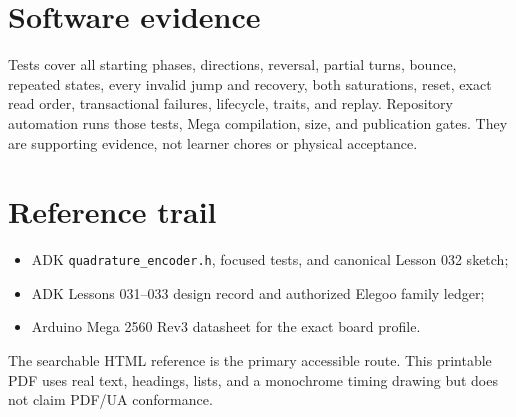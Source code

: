 \documentclass[11pt]{article}
\begin{document}
\section{Software evidence}

Tests cover all starting phases, directions, reversal, partial turns, bounce,
repeated states, every invalid jump and recovery, both saturations, reset,
exact read order, transactional failures, lifecycle, traits, and replay.
Repository automation runs those tests, Mega compilation, size, and publication
gates. They are supporting evidence, not learner chores or physical acceptance.

\section{Reference trail}

\begin{itemize}
  \item ADK \texttt{quadrature\_encoder.h}, focused tests, and canonical
        Lesson 032 sketch;
  \item ADK Lessons 031--033 design record and authorized Elegoo family ledger;
  \item Arduino Mega 2560 Rev3 datasheet for the exact board profile.
\end{itemize}

The searchable HTML reference is the primary accessible route. This printable
PDF uses real text, headings, lists, and a monochrome timing drawing but does
not claim PDF/UA conformance.
\end{document}
